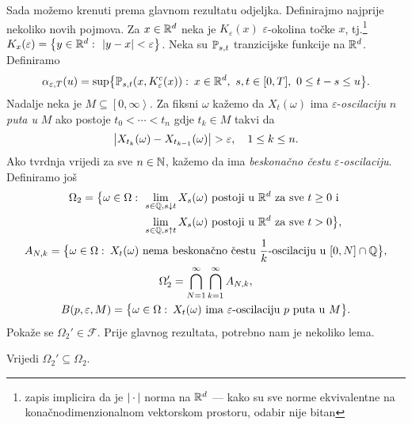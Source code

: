 \documentclass[main.tex]{subfiles}
\begin{document}
\nocite{*}

\bigskip
Sada možemo krenuti prema glavnom rezultatu odjeljka. Definirajmo najprije nekoliko novih pojmova.
Za \( x \in \mathbb{R}^d \) neka je \( K_\varepsilon(x) \) \( \varepsilon \)-okolina točke \( x \), tj.\footnote{zapis implicira da je  \( \left| {\, \cdot \,} \right| \) norma na \( \mathbb{R}^d \) --- kako su
	sve norme ekvivalentne na konačnodimenzionalnom vektorskom prostoru, odabir nije bitan}\
\( K_x(\varepsilon) = \left\{ y \in \mathbb{R}^d \, \colon \, \left| {y-x} \right| < \varepsilon \right\} \).
Neka su \( \mathbb{P}_{s,t} \) tranzicijske funkcije na \( \mathbb{R}^d \). Definiramo
\begin{equation}\label{eq:defalpha}
	\alpha_{\varepsilon, T}(u) = \sup \bigl\{ \mathbb{P}_{s,t}(x, K^c_\varepsilon(x)) \, \colon \, x \in \mathbb{R}^d, \ s, t \in [0, T], \ 0 \le t-s \le u \bigr\}.
\end{equation}
Nadalje neka je \( M \subseteq \left[ 0, \infty\right\rangle \). Za fiksni \( \omega \) kažemo da
\( X_t(\omega)  \) ima \( \varepsilon \)-\emph{oscilaciju} \( n \) \emph{puta u} \( M \) ako postoje
\( t_0 < \cdots < t_n \) gdje \( t_k \in M \) takvi da
\[
	\left| {X_{t_k}(\omega)-X_{t_{k-1}}(\omega)} \right| > \varepsilon, \quad 1 \le k \le n.
\]
Ako tvrdnja vrijedi za sve \( n \in \mathbb{N} \), kažemo da ima \emph{beskonačno čestu} \( \varepsilon \)\emph{-oscilaciju}. Definiramo još
\begin{gather}
	\begin{aligned}
		\Omega_2 = \bigl\{ \omega \in \Omega \st & \lim_{s \in \Q, s \downarrow t} X_s(\omega) \mathrm{\ postoji \ u \ } \R^d \mathrm{\ za \ sve \ } t \ge 0 \mathrm{ \ i \ } \\                                & \lim_{s \in \Q, s \uparrow t} X_s(\omega) \mathrm{\ postoji \ u \ } \R^d \mathrm{\ za \ sve \ } t > 0	\bigr\},
	\end{aligned}
	\\
	A_{N, k} = \bigl\{ \omega \in \Omega \st X_t(\omega) \mathrm{\ nema \ beskona\check cno \ \check cestu \ } \frac 1k \mathrm{\text{-oscilaciju}\ u \ } [0, N] \cap \Q \bigr\},
	\\
	\Omega_2' = \bigcap_{N=1}^\infty \bigcap_{k=1}^\infty A_{N, k},
	\\
	B(p, \varepsilon, M) = \bigl\{  \omega \in \Omega \st X_t(\omega) \mathrm{\ ima \ } \varepsilon \mathrm{\text{-oscilaciju}\ } p \mathrm{\ puta \ u \ } M  \bigr\}.
\end{gather}
Pokaže se \( \Omega_2' \in \mathcal F \). Prije glavnog rezultata, potrebno nam je nekoliko lema.
\begin{lema}
	Vrijedi \( \Omega_2' \subseteq \Omega_2 \).
\end{lema}
\end{document}
